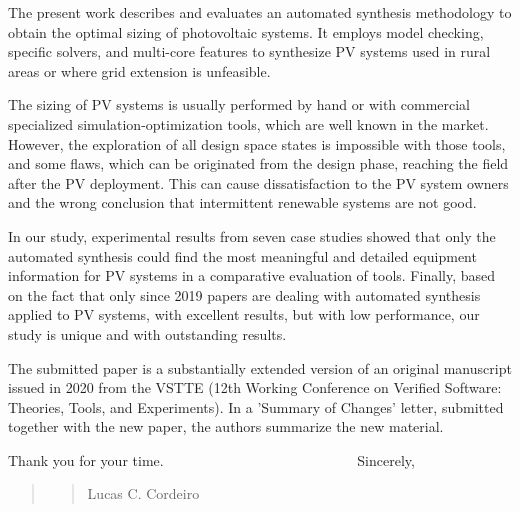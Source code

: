 \documentclass[11pt]{article}
\newcommand\vi{\vspace{\baselineskip}}
\begin{document}
The present work describes and evaluates an automated synthesis methodology to obtain the optimal sizing of photovoltaic systems. It employs model checking, specific solvers, and multi-core features to synthesize PV systems used in rural areas or where grid extension is unfeasible.

The sizing of PV systems is usually performed by hand or with commercial specialized simulation-optimization tools, which are well known in the market. However, the exploration of all design space states is impossible with those tools, and some flaws, which can be originated from the design phase, reaching the field after the PV deployment. This can cause dissatisfaction to the PV system owners and the wrong conclusion that intermittent renewable systems are not good.
   
In our study, experimental results from seven case studies showed that only the automated synthesis could find the most meaningful and detailed equipment information for PV systems in a comparative evaluation of tools. Finally, based on the fact that only since 2019 papers are dealing with automated synthesis applied to PV systems, with excellent results, but with low performance, our study is unique and with outstanding results.

The submitted paper is a substantially extended version of an original
manuscript issued in 2020 from the VSTTE (12th Working Conference on Verified Software: Theories, Tools, and Experiments). In a 'Summary of Changes' letter, submitted together with the new paper, the authors summarize the new material.

\vi
Thank you for your time.
\vi
\indent
~~~~~~~~~~~~~~~~~~~~~~~~~~~Sincerely,\\

\begin{quote}
\begin{quote}
\begin{flushright}



Lucas C. Cordeiro~~~~~~~
\end{flushright}
\end{quote}
\end{quote}


 
 
\end{document}
